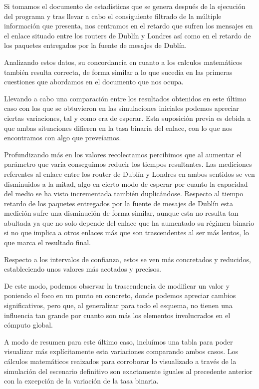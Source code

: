 Si tomamos el documento de estadísticas que se genera después de la ejecución del programa y tras llevar a cabo el consiguiente filtrado de la múltiple información que presenta, nos centramos en el retardo que sufren los mensajes en el enlace situado entre los routers de Dublín y Londres así como en el retardo de los paquetes entregados por la fuente de mesajes de Dublín.

Analizando estos datos, su concordancia en cuanto a los calculos matemáticos también resulta correcta, de forma similar a lo que sucedía en las primeras cuestiones que abordamos en el documento que nos ocupa.

Llevando a cabo una comparación entre los resultados obtenidos en este último caso con los que se obtuvieron en las simulaciones iniciales podemos apreciar ciertas variaciones, tal y como era de esperar. Esta suposición previa es debida a que ambas situaciones difieren en la tasa binaria del enlace, con lo que nos encontramos con algo que preveíamos.

Profundizando más en los valores recolectamos percibimos que al aumentar el parámetro que varía conseguimos reducir los tiempos resultantes. Las mediciones referentes al enlace entre los router de Dublín y Londres en ambos sentidos se ven disminuidos a la mitad, algo en cierto modo de esperar por cuanto la capacidad del medio se ha visto incrementada también duplicándose. Respecto al tiempo retardo de los paquetes entregados por la fuente de mesajes de Dublín esta medición sufre una disminución de forma similar, aunque esta no resulta tan abultada ya que no solo depende del enlace que ha aumentado su régimen binario si no que implica a otros enlaces más que son trascendentes al ser más lentos, lo que marca el resultado final.

Respecto a los intervalos de confianza, estos se ven más concretados y reducidos, estableciendo unos valores más acotados y precisos.

De este modo, podemos observar la trascendencia de modificar un valor y poniendo el foco en un punto en concreto, donde podemos apreciar cambios significativos, pero que, al generalizar para todo el esquema, no tienen una influencia tan grande por cuanto son más los elementos involucrados en el cómputo global.

A modo de resumen para este último caso, incluímos una tabla para poder visualizar más explícitamente esta variaciones comparando ambos casos. Los cálculos matemáticos reaizados para corroborar lo visualizado a través de la simulación del escenario definitivo son exactamente iguales al precedente anterior con la excepción de la variación de la tasa binaria.

